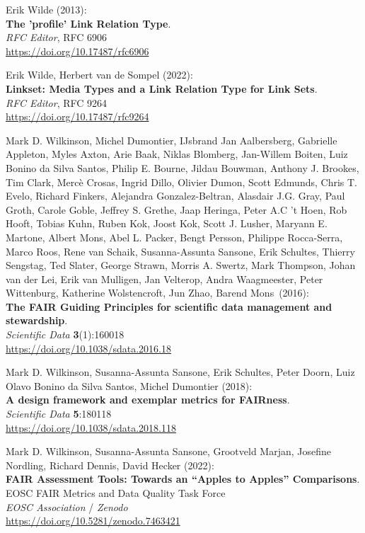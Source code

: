 \begin{thebibliography}{9}
Erik Wilde (2013):\\
\textbf{The 'profile' Link Relation Type}.\\
\emph{RFC Editor}, RFC 6906\\
\url{https://doi.org/10.17487/rfc6906}

Erik Wilde, Herbert van de Sompel (2022):\\
\textbf{Linkset: Media Types and a Link Relation Type for Link Sets}.\\
\emph{RFC Editor}, RFC 9264\\
\url{https://doi.org/10.17487/rfc9264}

Mark D. Wilkinson, Michel Dumontier, IJsbrand Jan
Aalbersberg, Gabrielle Appleton, Myles Axton, Arie Baak, Niklas
Blomberg, Jan-Willem Boiten, Luiz Bonino da Silva Santos, Philip E.
Bourne, Jildau Bouwman, Anthony J. Brookes, Tim Clark, Mercè Crosas,
Ingrid Dillo, Olivier Dumon, Scott Edmunds, Chris T. Evelo, Richard
Finkers, Alejandra Gonzalez-Beltran, Alasdair J.G. Gray, Paul Groth,
Carole Goble, Jeffrey S. Grethe, Jaap Heringa, Peter A.C 't Hoen, Rob
Hooft, Tobias Kuhn, Ruben Kok, Joost Kok, Scott J. Lusher, Maryann E.
Martone, Albert Mons, Abel L. Packer, Bengt Persson, Philippe
Rocca-Serra, Marco Roos, Rene van Schaik, Susanna-Assunta Sansone, Erik
Schultes, Thierry Sengstag, Ted Slater, George Strawn, Morris A. Swertz,
Mark Thompson, Johan van der Lei, Erik van Mulligen, Jan Velterop, Andra
Waagmeester, Peter Wittenburg, Katherine Wolstencroft, Jun Zhao, Barend
Mons~(2016):\\
\textbf{The FAIR Guiding Principles for scientific data management and
stewardship}.\\
\emph{Scientific Data} \textbf{3}(1):160018\\
\url{https://doi.org/10.1038/sdata.2016.18}

Mark D. Wilkinson, Susanna-Assunta Sansone, Erik Schultes, Peter Doorn, Luiz Olavo Bonino da Silva Santos, Michel Dumontier (2018):\\
\textbf{A design framework and exemplar metrics for FAIRness}.\\
\emph{Scientific Data} \textbf{5}:180118 \\
\url{https://doi.org/10.1038/sdata.2018.118}

Mark D. Wilkinson, Susanna-Assunta Sansone, Grootveld Marjan, Josefine
Nordling, Richard Dennis, David Hecker (2022): \\
\textbf{FAIR Assessment Tools: Towards an “Apples to Apples” Comparisons}.\\ 
EOSC FAIR Metrics and Data Quality Task Force\\
\emph{EOSC Association} / \emph{Zenodo}\\
\url{https://doi.org/10.5281/zenodo.7463421}


\end{thebibliography}
